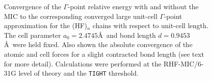 \documentclass[prl,twocolumn,showpacs,twocolumngrid,superbib]{revtex4}
\begin{document}
\begin{figure}[h]
  \caption{Convergence of the $\Gamma$-point relative energy with and without the MIC to the corresponding 
    converged large unit-cell $\Gamma$-point approximation
    for the (HF)$_n$ chains with respect to unit-cell length. The cell parameter 
    $a_0=2.4745$\AA~and bond length $d=0.9453$\AA~were held fixed. 
    Also shown the absolute convergence of the atomic and cell forces for a slight contracted 
    bond length (see text for more detail).
    Calculations were performed at the RHF-MIC/6-31G level of theory and the {\tt TIGHT} threshold.}\label{Fig:CnvgEnergy}
\end{figure}
\end{document}
